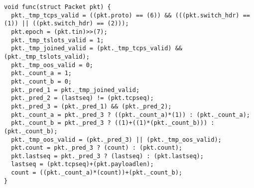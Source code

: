 
\begin{lstlisting}
void func(struct Packet pkt) {
  pkt._tmp_tcps_valid = ((pkt.proto) == (6)) && (((pkt.switch_hdr) == (1)) || ((pkt.switch_hdr) == (2)));
  pkt.epoch = (pkt.tin)>>(7);
  pkt._tmp_tslots_valid = 1;
  pkt._tmp_joined_valid = (pkt._tmp_tcps_valid) && (pkt._tmp_tslots_valid);
  pkt._tmp_oos_valid = 0;
  pkt._count_a = 1;
  pkt._count_b = 0;
  pkt._pred_1 = pkt._tmp_joined_valid;
  pkt._pred_2 = (lastseq) != (pkt.tcpseq);
  pkt._pred_3 = (pkt._pred_1) && (pkt._pred_2);
  pkt._count_a = pkt._pred_3 ? ((pkt._count_a)*(1)) : (pkt._count_a);
  pkt._count_b = pkt._pred_3 ? ((1)+((1)*(pkt._count_b))) : (pkt._count_b);
  pkt._tmp_oos_valid = (pkt._pred_3) || (pkt._tmp_oos_valid);
  pkt.count = pkt._pred_3 ? (count) : (pkt.count);
  pkt.lastseq = pkt._pred_3 ? (lastseq) : (pkt.lastseq);
  lastseq = (pkt.tcpseq)+(pkt.payloadlen);
  count = ((pkt._count_a)*(count))+(pkt._count_b);
}
\end{lstlisting}
